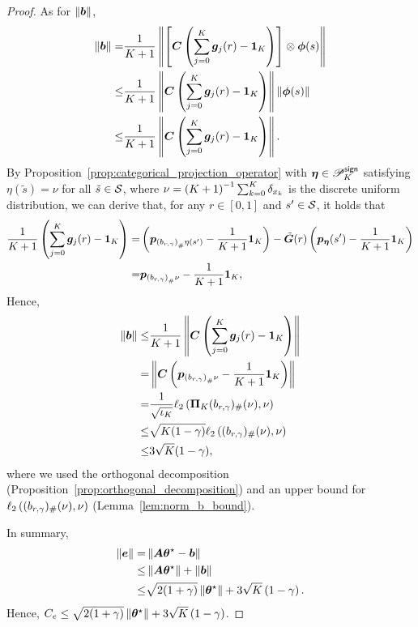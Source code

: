 \begin{proof}
As for $\left\|{{\bm{b}}}\right\|$, 
\begin{equation}\label{eq:bt_upper_bound}
    \begin{aligned}
       \left\|{{\bm{b}}}\right\|=&\frac{1}{K+1}\left\|{\left[{{\bm{C}}\left({\sum_{j=0}^K{\bm{g}}_j(r)-\bm{1}_K}\right)}\right]\otimes{\bm{\phi}}(s)}\right\|\\
       \leq&\frac{1}{K+1}\left\|{{\bm{C}}\left({\sum_{j=0}^K{\bm{g}}_j(r)-\bm{1}_K}\right)}\right\|\left\|{{\bm{\phi}}(s)}\right\|\\
       \leq&\frac{1}{K+1}\left\|{{\bm{C}}\left({\sum_{j=0}^K{\bm{g}}_j(r)-\bm{1}_K}\right)}\right\|.
    \end{aligned}
\end{equation}
By Proposition~\ref{prop:categorical_projection_operator} with ${\bm{\eta}}\in{\mathscr{P}}^{\mathsf{sign}}_K$ satisfying 
$\eta(\tilde s)=\nu$ 
for all $\tilde s\in{\mathcal{S}}$, where $\nu=\left({K+1}\right)^{-1}\sum_{k=0}^K \delta_{x_k}$ is the discrete uniform distribution, we can derive that, for any $r\in[0,1]$ and $s^\prime\in{\mathcal{S}}$, it holds that
\begin{equation*}
    \begin{aligned}
        \frac{1}{K+1}\left({\sum_{j=0}^K{\bm{g}}_j(r)-\bm{1}_K}\right)=&\left({{\bm{p}}_{\left({b_{r,\gamma}}\right)_\#{\eta}(s^\prime)}-\frac{1}{K+1}\bm{1}_K}\right)-\tilde{{\bm{G}}}(r) \left({{\bm{p}}_{\bm{\eta}}(s^{\prime})-\frac{1}{K+1}\bm{1}_{K}}\right) \\
        =&{\bm{p}}_{\left({b_{r,\gamma}}\right)_\#\nu}-\frac{1}{K+1}\bm{1}_K,
    \end{aligned}
\end{equation*}
Hence,
\begin{equation*}
    \begin{aligned}
       \left\|{{\bm{b}}}\right\|\leq&\frac{1}{K+1}\left\|{{\bm{C}}\left({\sum_{j=0}^K{\bm{g}}_j(r)-\bm{1}_K}\right)}\right\|\\
       =&\left\|{{\bm{C}}\left({{\bm{p}}_{\left({b_{r,\gamma}}\right)_\#\nu}-\frac{1}{K+1}\bm{1}_K}\right)}\right\|\\
       =& \frac{1}{\sqrt{\iota_K}}\ell_2\left({{\bm{\Pi}}_K(b_{r,\gamma})_\#(\nu),\nu}\right)\\
       \leq& \sqrt{K(1-\gamma)}\ell_2\left({(b_{r,\gamma})_\#(\nu) ,\nu}\right)\\
       \leq& 3\sqrt{K}(1-\gamma),
    \end{aligned}
\end{equation*}
where we used the orthogonal decomposition (Proposition~\ref{prop:orthogonal_decomposition}) and an upper bound for $\ell_2\left({(b_{r,\gamma})_\#(\nu) ,\nu}\right)$ (Lemma~\ref{lem:norm_b_bound}).

In summary,
\begin{equation*}
    \begin{aligned}
        \left\|{{\bm{e}}}\right\|=&\left\|{{\bm{A}}{\bm{\theta}}^{\star}-{\bm{b}}}\right\|\\
        \leq&\left\|{{\bm{A}}{\bm{\theta}}^{\star}}\right\|+\left\|{{\bm{b}}}\right\|\\
        \leq& \sqrt{2(1+\gamma)}\left\|{{\bm{\theta}}^{\star}}\right\|+3\sqrt{K}\left({1-\gamma}\right).
    \end{aligned}
\end{equation*}
Hence, $C_e\leq \sqrt{2(1+\gamma)}\left\|{{\bm{\theta}}^{\star}}\right\|+3\sqrt{K}\left({1-\gamma}\right)$.

\end{proof}
